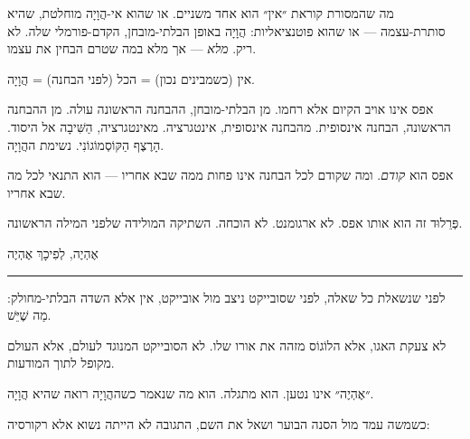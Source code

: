 \documentclass[10pt, openany, oneside]{book}
\renewcommand{\large}{\fontsize{11.5}{14}\selectfont}
\begin{document}
\vspace{0.5em}

\noindent מה שהמסורת קוראת ״אין״ הוא אחד משניים. או שהוא אי-הֲוָיָה מוחלטת, שהיא סותרת-עצמה — או שהוא פוטנציאליות: הֲוָיָה באופן הבלתי-מובחן, הקדם-פורמלי שלה. לא ריק. \textit{מלא} — אך מלא במה שטרם הבחין את עצמו.

\vspace{0.5em}

\noindent אין (כשמבינים נכון) = הכל (לפני הבחנה) = הֲוָיָה.

\vspace{0.5em}

\noindent אפס אינו אויב הקיום אלא רחמו. מן הבלתי-מובחן, ההבחנה הראשונה עולה. מן ההבחנה הראשונה, הבחנה אינסופית. מהבחנה אינסופית, אינטגרציה. מאינטגרציה, הַשִּׁיבָה אל היסוד. הָרֶצֶף הַקּוֹסְמוֹגוֹנִי. נשימת ההֲוָיָה.

\vspace{0.5em}

\noindent אפס הוא \textit{קודם}. ומה שקודם לכל הבחנה אינו פחות ממה שבא אחריו — הוא התנאי לכל מה שבא אחריו.

\vspace{0.5em}

\noindent פְּרֵלוּד זה הוא אותו אפס. לא ארגומנט. לא הוכחה. השתיקה המולידה שלפני המילה הראשונה.

\vspace{2em}

\begin{center}
    {\large\textsc{אֶהְיֶה, לְפִיכָךְ אֶהְיֶה}}\\[0.3em]
    \rule{0.2\textwidth}{0.3pt}
\end{center}

\vspace{1em}

\noindent לפני שנשאלת כל שאלה, לפני שסובייקט ניצב מול אובייקט, אין אלא השדה הבלתי-מחולק: מַה שֶׁיֵּשׁ.

\vspace{0.5em}

\noindent לא צעקת האגו, אלא הלוֹגוֹס מזהה את אורו שלו. לא הסובייקט המנוגד לעולם, אלא העולם מקופל לתוך המודעות.

\vspace{0.5em}

\noindent ״אֶהְיֶה״ אינו נטען. הוא מתגלה. הוא מה שנאמר כשההֲוָיָה רואה שהיא הֲוָיָה.

\vspace{0.5em}

\noindent כשמשה עמד מול הסנה הבוער ושאל את השם, התגובה לא הייתה נשוא אלא רקורסיה:
\end{document}
